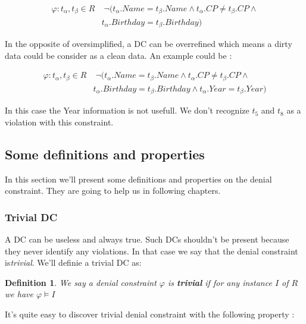 \documentclass[letterpaper, 12pt]{report}
\newtheorem{mydef}{Definition}
\begin{document}
\begin{displaymath}
  \begin{split}
    \varphi : t_\alpha,t_\beta \in R &\; \neg(t_\alpha.Name = t_\beta.Name \wedge t_\alpha.CP \neq t_\beta.CP \wedge \\
    & t_\alpha.Birthday = t_\beta.Birthday)
  \end{split}
\end{displaymath}

In the opposite of oversimplified, a DC can be overrefined which means a dirty data could be consider as a clean data. An example could be :

\begin{displaymath}
  \begin{split}
    \varphi : t_\alpha,t_\beta \in R &\; \neg(t_\alpha.Name = t_\beta.Name \wedge t_\alpha.CP \neq t_\beta.CP \wedge \\
    & t_\alpha.Birthday = t_\beta.Birthday \wedge t_\alpha.Year = t_\beta.Year)
  \end{split}
\end{displaymath}

In this case the Year information is not usefull. We don't recognize $t_5$ and $t_8$ as a violation with this constraint.

\subsection{Some definitions and properties}

In this section we'll present some definitions and properties on the denial constraint. They are going to help us in following chapters.

\subsubsection{Trivial DC}

A DC can be useless and always true. Such DCs shouldn't be present because they never identify any violations. In that case we say that the denial constraint is\emph{trivial}. We'll definie a trivial DC as:

\begin{mydef}
	We say a denial constraint $\varphi$ is \textbf{trivial} if for any instance $I$  of $R$ we have $\varphi \models I$
\end{mydef}

It's quite easy to discover trivial denial constraint with the following property \cite{DCs}:
\end{document}
